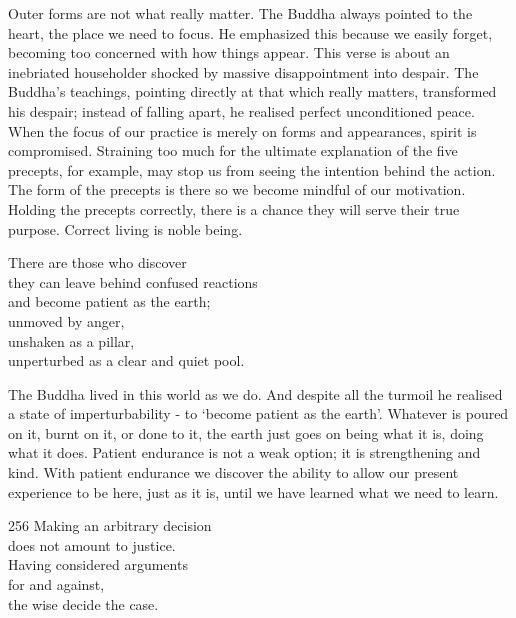 \begin{dhpRefl}

Outer forms are not what really matter. The Buddha always pointed to
the heart, the place we need to focus. He emphasized this because we
easily forget, becoming too concerned with how things appear. This
verse is about an inebriated householder shocked by massive
disappointment into despair. The Buddha's teachings, pointing
directly at that which really matters, transformed his despair;
instead of falling apart, he realised perfect unconditioned peace.
When the focus of our practice is merely on forms and appearances,
spirit is compromised. Straining too much for the ultimate
explanation of the five precepts, for example, may stop us from
seeing the intention behind the action. The form of the precepts is
there so we become mindful of our motivation. Holding the precepts
correctly, there is a chance they will serve their true purpose.
Correct living is noble being.

\end{dhpRefl}


\begin{dhpVerse}{95}
\label{dhp-95}
There are those who discover\\
they can leave behind confused reactions\\
and become patient as the earth;\\
unmoved by anger,\\
unshaken as a pillar,\\
unperturbed as a clear and quiet pool.
\end{dhpVerse}

\begin{dhpRefl}

The Buddha lived in this world as we do. And despite all the turmoil
he realised a state of imperturbability - to `become patient as the
earth'. Whatever is poured on it, burnt on it, or done to it, the
earth just goes on being what it is, doing what it does. Patient
endurance is not a weak option; it is strengthening and kind. With
patient endurance we discover the ability to allow our present
experience to be here, just as it is, until we have learned what we
need to learn.

\end{dhpRefl}


\begin{dhpVerse}{256}
\label{dhp-256}
Making an arbitrary decision\\
does not amount to justice.\\
Having considered arguments\\
for and against,\\
the wise decide the case.
\end{dhpVerse}

